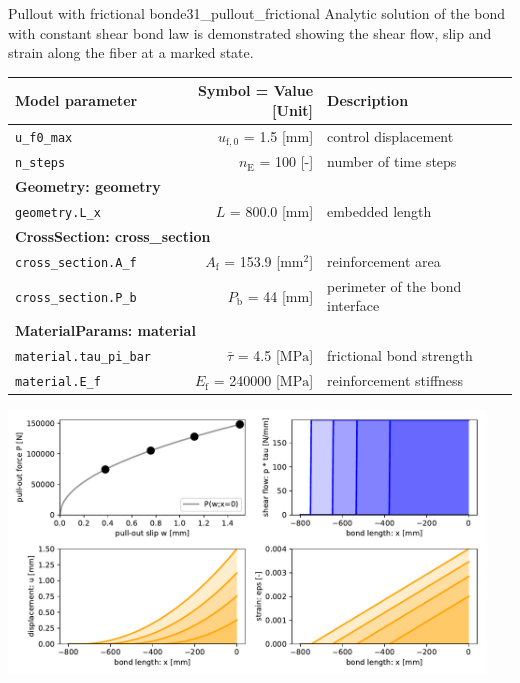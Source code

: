 \documentclass[main.tex]{subfiles}
\begin{document}
\begin{bmcsex}{Pullout with frictional bond}{e31_pullout_frictional}
\noindent Analytic solution of the bond with constant shear
    bond law is demonstrated showing the shear flow, slip and strain
    along the fiber at a marked state.
 \\
\begin{center}
            
{\scriptsize 
\begin{longtable}{lrp{4cm}}\toprule
\textbf{\textsf{Model parameter}} 
& 
\textbf{\textsf{Symbol = Value [Unit]}} 
&
\textbf{\textsf{Description}}  \\\midrule \midrule
\texttt{u\_f0\_max} & $u_{\mathrm{f},0}$ = 1.5 [mm] & {\footnotesize control displacement}  \\
            \texttt{n\_steps} & $n_\mathrm{E}$ = 100 [-] & {\footnotesize number of time steps}  \\
            \midrule
\multicolumn{3}{l}{\textbf{\textsf{Geometry: geometry}}}\\

\texttt{geometry.L\_x} & $L$ = 800.0 [mm] & {\footnotesize embedded length}  \\
            \midrule
\multicolumn{3}{l}{\textbf{\textsf{CrossSection: cross\_section}}}\\

\texttt{cross\_section.A\_f} & $A_\mathrm{f}$ = 153.9 [$\mathrm{mm}^2$] & {\footnotesize reinforcement area}  \\
            \texttt{cross\_section.P\_b} & $P_\mathrm{b}$ = 44 [$\mathrm{mm}$] & {\footnotesize perimeter of the bond interface}  \\
            \midrule
\multicolumn{3}{l}{\textbf{\textsf{MaterialParams: material}}}\\

\texttt{material.tau\_pi\_bar} & $\bar{\tau}$ = 4.5 [$\mathrm{MPa}$] & {\footnotesize frictional bond strength}  \\
            \texttt{material.E\_f} & $E_\mathrm{f}$ = 240000 [$\mathrm{MPa}$] & {\footnotesize reinforcement stiffness}  \\
            \bottomrule 
\end{longtable}
}

    \includegraphics[width=0.95\textwidth]{examples/e31_pullout_frictional/fig_frictional_bond.pdf}
    \end{center}
            \end{bmcsex}
\end{document}
